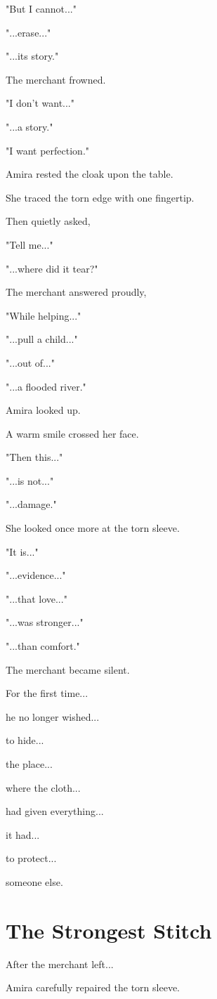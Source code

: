 \documentclass[12pt,openany]{book}
\begin{document}
"But I cannot..."

"...erase..."

"...its story."

The merchant frowned.

"I don't want..."

"...a story."

"I want perfection."

Amira rested the cloak upon the table.

She traced the torn edge with one fingertip.

Then quietly asked,

"Tell me..."

"...where did it tear?"

The merchant answered proudly,

"While helping..."

"...pull a child..."

"...out of..."

"...a flooded river."

Amira looked up.

A warm smile crossed her face.

"Then this..."

"...is not..."

"...damage."

She looked once more at the torn sleeve.

"It is..."

"...evidence..."

"...that love..."

"...was stronger..."

"...than comfort."

The merchant became silent.

For the first time...

he no longer wished...

to hide...

the place...

where the cloth...

had given everything...

it had...

to protect...

someone else.
\section*{The Strongest Stitch}

After the merchant left...

Amira carefully repaired the torn sleeve.
\end{document}
